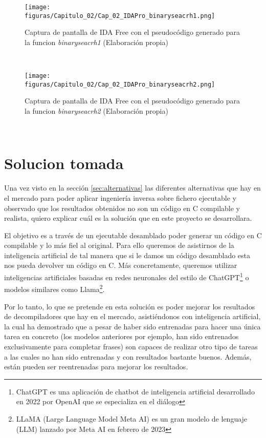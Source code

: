 \begin{figure}[H]
    \begin{center}
      \texttt{[image: figuras/Capitulo\_02/Cap\_02\_IDAPro\_binaryseacrh1.png]}
    \end{center}
    \caption[Captura de pantalla de IDA Free con el pseudocódigo generado para la funcion \textit{binaryseacrh1}]{Captura de pantalla de IDA Free con el pseudocódigo generado para la funcion \textit{binaryseacrh1} (Elaboración propia)}
    \label{fig:IDAPro_binaryseacrh1}
\end{figure}\

\begin{figure}[H]
    \begin{center}
      \texttt{[image: figuras/Capitulo\_02/Cap\_02\_IDAPro\_binaryseacrh2.png]}
    \end{center}
    \caption[Captura de pantalla de IDA Free con el pseudocódigo generado para la funcion \textit{binaryseacrh2}]{Captura de pantalla de IDA Free con el pseudocódigo generado para la funcion \textit{binaryseacrh2} (Elaboración propia)}
    \label{fig:IDAPro_binaryseacrh2}
\end{figure}\

\section{Solucion tomada}
\label{sec:solucion}


Una vez visto en la sección \ref{sec:alternativas} las diferentes alternativas que hay
en el mercado para poder aplicar ingeniería inversa sobre fichero ejecutable y observado
que los resultados obtenidos no son un código en C compilable y realista, quiero explicar
cuál es la solución que en este proyecto se desarrollara.

El objetivo es a través de un ejecutable desamblado poder generar un código en C compilable
y lo más fiel al original. Para ello queremos de asistirnos de la inteligencia artificial
de tal manera que si le damos un código desamblado esta nos pueda devolver un código en C.
Más concretamente, queremos utilizar inteligencias artificiales basadas en redes neuronales
del estilo de ChatGPT\footnote{ChatGPT es una aplicación de chatbot de inteligencia artificial
desarrollado en 2022 por OpenAI que se especializa en el diálogo} o modelos similares como 
Llama\footnote{LLaMA (Large Language Model Meta AI) es un gran modelo de lenguaje (LLM) 
lanzado por Meta AI en febrero de 2023}.

Por lo tanto, lo que se pretende en esta solución es poder mejorar los resultados de decompiladores
que hay en el mercado, asistiéndonos con inteligencia artificial, la cual ha demostrado
que a pesar de haber sido entrenadas para hacer una única tarea en concreto (los modelos anteriores
por ejemplo, han sido entrenados exclusivamente para completar frases) son capaces de
realizar otro tipo de tareas a las cuales no han sido entrenadas y con resultados bastante buenos.
Además, están pueden ser reentrenadas para mejorar los resultados.
